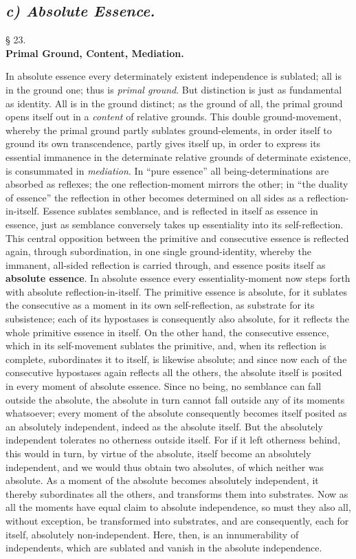 \documentclass[12pt,a4paper,openany]{book}
\newcommand{\opage}[1]{\marginnote{\footnotesize\textit{[#1]}}}
\newcommand{\underafsnit}[1]{\subsection*{\centering\emph{#1}}\addcontentsline{toc}{subsection}{#1}}
\newcommand{\paragraf}[2]{\begin{center}§ #1.\\[0.2em]\textbf{#2}\end{center}}
\begin{document}
\underafsnit{c) Absolute Essence.}
\paragraf{23}{Primal Ground, Content, Mediation.}

In absolute essence every determinately existent
independence is sublated; all is in the ground one; thus is
\emph{primal ground}. But distinction is just as
fundamental as identity. All is in the ground distinct; as the ground of all, the primal ground opens itself out in a \emph{content} of relative grounds. This double
\setcounter{footnote}{0}%
\opage{125}ground-movement, whereby the primal ground partly sublates ground-elements, in order itself to ground its own
transcendence, partly gives itself up, in order to express its essential immanence in
the determinate relative grounds of determinate existence, is consummated in \emph{mediation}. In ``pure essence'' all being-determinations are absorbed
as reflexes; the one reflection-moment mirrors the
other; in ``the duality of essence'' the reflection in %
other becomes determined on all sides as a reflection-in-itself. Essence
sublates semblance, and is reflected in itself as essence in essence,
just as semblance conversely takes up essentiality
into its self-reflection. This central opposition
between the primitive and consecutive essence is reflected
again, through subordination, in one single ground-identity,
whereby the immanent, all-sided reflection is carried through,
and essence posits itself as \textbf{absolute essence}.
In absolute essence every essentiality-moment now steps forth
with absolute reflection-in-itself. The primitive
essence is absolute, for it sublates the consecutive as
a moment in its own self-reflection, as substrate for
its subsistence; each of its hypostases is consequently
also absolute, for it reflects the whole primitive essence
in itself. On the other hand, the consecutive
essence, which in its self-movement sublates the primitive,
and, when its reflection is complete, subordinates it
to itself, is likewise absolute; and since now each of the
consecutive hypostases again reflects all the others,
the absolute itself is posited in every moment of
absolute essence. Since no being, no semblance can
fall outside the absolute, the absolute in turn cannot
fall outside any of its moments whatsoever; every
moment of the absolute consequently becomes itself posited
as an absolutely independent, indeed as the absolute itself.
\setcounter{footnote}{0}%
\opage{126}But the absolutely independent tolerates no otherness
outside itself. For if it left otherness behind,
this would in turn, by virtue of the absolute, itself become
an absolutely independent, and we would thus obtain two
absolutes, of which neither was absolute. As a moment
of the absolute becomes absolutely independent, it thereby
subordinates all the others, and transforms them into substrates.
Now as all the moments have equal claim to
absolute independence, so must they also all, without
exception, be transformed into substrates, and are consequently,
each for itself, absolutely non-independent. Here, then, is an
innumerability of independents, which are sublated and vanish
in the absolute independence.
\end{document}
